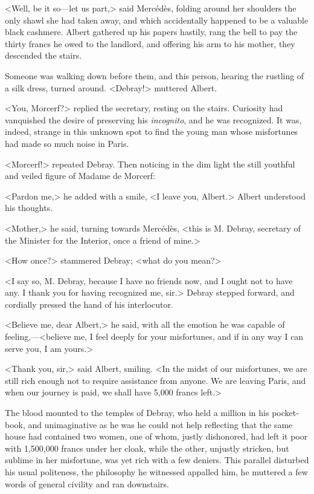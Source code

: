  <Well, be it so—let us part,> said Mercédès, folding around her shoulders the only shawl she had taken away, and which accidentally happened to be a valuable black cashmere. Albert gathered up his papers hastily, rang the bell to pay the thirty francs he owed to the landlord, and offering his arm to his mother, they descended the stairs. 

 Someone was walking down before them, and this person, hearing the rustling of a silk dress, turned around. <Debray!> muttered Albert. 

 <You, Morcerf?> replied the secretary, resting on the stairs. Curiosity had vanquished the desire of preserving his \textit{incognito}, and he was recognized. It was, indeed, strange in this unknown spot to find the young man whose misfortunes had made so much noise in Paris. 

 <Morcerf!> repeated Debray. Then noticing in the dim light the still youthful and veiled figure of Madame de Morcerf: 

 <Pardon me,> he added with a smile, <I leave you, Albert.> Albert understood his thoughts. 

 <Mother,> he said, turning towards Mercédès, <this is M. Debray, secretary of the Minister for the Interior, once a friend of mine.> 

 <How once?> stammered Debray; <what do you mean?> 

 <I say so, M. Debray, because I have no friends now, and I ought not to have any. I thank you for having recognized me, sir.> Debray stepped forward, and cordially pressed the hand of his interlocutor. 

 <Believe me, dear Albert,> he said, with all the emotion he was capable of feeling,—<believe me, I feel deeply for your misfortunes, and if in any way I can serve you, I am yours.> 

 <Thank you, sir,> said Albert, smiling. <In the midst of our misfortunes, we are still rich enough not to require assistance from anyone. We are leaving Paris, and when our journey is paid, we shall have 5,000 francs left.> 

 The blood mounted to the temples of Debray, who held a million in his pocket-book, and unimaginative as he was he could not help reflecting that the same house had contained two women, one of whom, justly dishonored, had left it poor with 1,500,000 francs under her cloak, while the other, unjustly stricken, but sublime in her misfortune, was yet rich with a few deniers. This parallel disturbed his usual politeness, the philosophy he witnessed appalled him, he muttered a few words of general civility and ran downstairs. 

